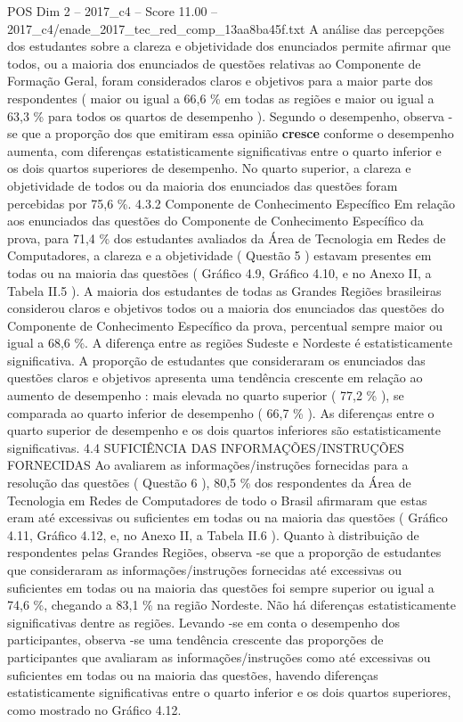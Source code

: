 \begin{textsample}{POS Dim 2 – 2017\_c4 – Score 11.00 – 2017\_c4/enade\_2017\_tec\_red\_comp\_13aa8ba45f.txt}
A análise das percepções dos estudantes sobre a clareza e objetividade dos enunciados permite afirmar que todos, ou a maioria dos enunciados de questões relativas ao Componente de Formação Geral, foram considerados claros e objetivos para a maior parte dos respondentes ( maior ou igual a 66,6 \% em todas as regiões e maior ou igual a 63,3 \% para todos os quartos de desempenho ).
Segundo o desempenho, observa -se que a proporção dos que emitiram essa opinião \textbf{cresce} conforme o desempenho aumenta, com diferenças estatisticamente significativas entre o quarto inferior e os dois quartos superiores de desempenho.
No quarto superior, a clareza e objetividade de todos ou da maioria dos enunciados das questões foram percebidas por 75,6 \%. 4.3.2 Componente de Conhecimento Específico Em relação aos enunciados das questões do Componente de Conhecimento Específico da prova, para 71,4 \% dos estudantes avaliados da Área de Tecnologia em Redes de Computadores, a clareza e a objetividade ( Questão 5 ) estavam presentes em todas ou na maioria das questões ( Gráfico 4.9, Gráfico 4.10, e no Anexo II, a Tabela II.5 ).
A maioria dos estudantes de todas as Grandes Regiões brasileiras considerou claros e objetivos todos ou a maioria dos enunciados das questões do Componente de Conhecimento Específico da prova, percentual sempre maior ou igual a 68,6 \%.
A diferença entre as regiões Sudeste e Nordeste é estatisticamente significativa.
A proporção de estudantes que consideraram os enunciados das questões claros e objetivos apresenta uma tendência crescente em relação ao aumento de desempenho : mais elevada no quarto superior ( 77,2 \% ), se comparada ao quarto inferior de desempenho ( 66,7 \% ).
As diferenças entre o quarto superior de desempenho e os dois quartos inferiores são estatisticamente significativas. 4.4 SUFICIÊNCIA DAS INFORMAÇÕES/INSTRUÇÕES FORNECIDAS Ao avaliarem as informações/instruções fornecidas para a resolução das questões ( Questão 6 ), 80,5 \% dos respondentes da Área de Tecnologia em Redes de Computadores de todo o Brasil afirmaram que estas eram até excessivas ou suficientes em todas ou na maioria das questões ( Gráfico 4.11, Gráfico 4.12, e, no Anexo II, a Tabela II.6 ).
Quanto à distribuição de respondentes pelas Grandes Regiões, observa -se que a proporção de estudantes que consideraram as informações/instruções fornecidas até excessivas ou suficientes em todas ou na maioria das questões foi sempre superior ou igual a 74,6 \%, chegando a 83,1 \% na região Nordeste.
Não há diferenças estatisticamente significativas dentre as regiões.
Levando -se em conta o desempenho dos participantes, observa -se uma tendência crescente das proporções de participantes que avaliaram as informações/instruções como até excessivas ou suficientes em todas ou na maioria das questões, havendo diferenças estatisticamente significativas entre o quarto inferior e os dois quartos superiores, como mostrado no Gráfico 4.12.

\end{textsample}
